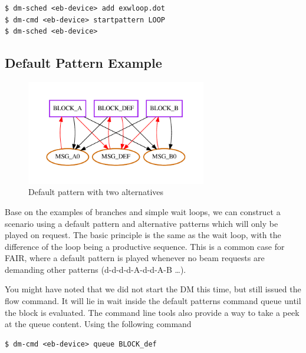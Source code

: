 \begin{lstlisting}[style = customshell]
$ dm-sched <eb-device> add exwloop.dot
$ dm-cmd <eb-device> startpattern LOOP
$ dm-sched <eb-device>
\end{lstlisting}

\newpage
\subsection{Default Pattern Example}

\begin{figure}[H]
   \centering
   \def\svgwidth{0.7\textwidth}
   \includegraphics*[width=0.7\textwidth,keepaspectratio]{Figures/exdefpat}
   \caption{ Default pattern with two alternatives }
   \label{fig:exdefpat}
\end{figure}



Base on the examples of branches and simple wait loops, we can construct a scenario using a default pattern and alternative patterns which will only be played on request.
The basic principle is the same as the wait loop, with the difference of the loop being a productive sequence. This is a common case for FAIR, where a default pattern is played whenever no
beam requests are demanding other patterns (d-d-d-d-A-d-d-A-B \dots).
\par You might have noted that we did not start the DM this time, but still issued the flow command. It will lie in wait inside the default patterns command queue until the block is evaluated.
The command line tools also provide a way to take a peek at the queue content. Using the following command

\begin{lstlisting}[style = customshell]
$ dm-cmd <eb-device> queue BLOCK_def
\end{lstlisting}

